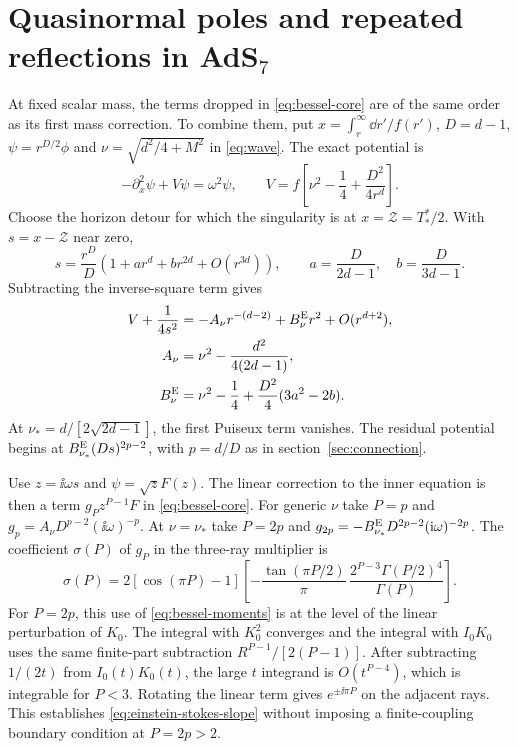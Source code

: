 \section{Quasinormal poles and repeated reflections in \texorpdfstring{AdS\(_7\)}{AdS7}}
\label{sec:einstein-poles}

At fixed scalar mass, the terms dropped in \eqref{eq:bessel-core} are
of the same order as its first mass correction. To combine them,
put \(x=\int_r^\infty\dd r'/f(r')\), \(D=d-1\),
\(\psi=r^{D/2}\phi\) and \(\nu=\sqrt{d^2/4+M^2}\) in
\eqref{eq:wave}. The exact potential is
\begin{equation}
 -\partial_x^2\psi+V\psi=\omega^2\psi,\qquad
 V=f\left[\nu^2-\frac14+\frac{D^2}{4r^d}\right].
 \label{eq:einstein-potential}
\end{equation}
Choose the horizon detour for which the singularity is at
\(x=\mathcal Z=T_*^*/2\). With \(s=x-\mathcal Z\) near zero,
\begin{equation}
 s=\frac{r^D}{D}\left(1+a r^d+b r^{2d}+O(r^{3d})\right),
 \qquad a=\frac{D}{2d-1},\quad b=\frac{D}{3d-1}.
\end{equation}
Subtracting the inverse-square term gives
\begin{equation}
 \begin{aligned}
 V+\frac{1}{4s^2}
 &=-A_\nu r^{-(d-2)}+B_\nu^{\rm E}r^2+O(r^{d+2}),\\
 A_\nu&=\nu^2-\frac{d^2}{4(2d-1)},\\
 B_\nu^{\rm E}&=\nu^2-\frac14+\frac{D^2}{4}(3a^2-2b).
 \end{aligned}
 \label{eq:einstein-shifts}
\end{equation}
At \(\nu_*={d}/[{2\sqrt{2d-1}}]\), the first Puiseux term
vanishes. The residual potential begins at
\(B_{\nu_*}^{\rm E}(D s)^{2p-2}\), with \(p=d/D\) as in
section~\ref{sec:connection}.

Use \(z=\ii\omega s\) and \(\psi=\sqrt z F(z)\). The linear
correction to the inner equation is then a term
\(g_P z^{P-1}F\) in \eqref{eq:bessel-core}. For generic \(\nu\)
take \(P=p\) and \(g_p=A_\nu D^{p-2}(\ii\omega)^{-p}\).
At \(\nu=\nu_*\) take \(P=2p\) and
\(g_{2p}=-B_{\nu_*}^{\rm E}D^{2p-2}(\mathrm{i}\omega)^{-2p}\).
The coefficient \(\sigma(P)\) of \(g_P\) in the three-ray
multiplier is
\begin{equation}
 \sigma(P)=2[\cos(\pi P)-1]
 \left[-\frac{\tan(\pi P/2)}{\pi}\,
       \frac{2^{P-3}\Gamma(P/2)^4}{\Gamma(P)}\right].
 \label{eq:einstein-stokes-slope}
\end{equation}
For \(P=2p\), this use of \eqref{eq:bessel-moments} is at the
level of the linear perturbation of \(K_0\). The integral with
\(K_0^2\) converges and the integral with \(I_0K_0\) uses the
same finite-part subtraction \(R^{P-1}/[2(P-1)]\).
After subtracting \(1/(2t)\) from \(I_0(t)K_0(t)\), the large
\(t\) integrand is \(O(t^{P-4})\), which is integrable for
\(P<3\). Rotating the linear term gives \(e^{\pm\ii\pi P}\)
on the adjacent rays. This establishes \eqref{eq:einstein-stokes-slope}
without imposing a finite-coupling boundary condition at
\(P=2p>2\).

